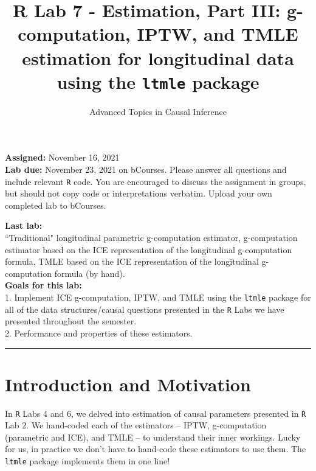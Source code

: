 \documentclass[answers]{exam}
\title{R Lab 7 - Estimation, Part III: g-computation, IPTW, and TMLE estimation for longitudinal data using the \texttt{ltmle} package}
\author{Advanced Topics in Causal Inference}
\date{}
\begin{document}
\maketitle



\maketitle
\noindent \textbf{Assigned:} November 16, 2021\\
\textbf{Lab due:} November 23, 2021 on bCourses. Please answer all questions and include relevant \texttt{R} code. You are encouraged to discuss the assignment in groups, but should not copy code or interpretations verbatim. Upload your own completed lab to bCourses.



\noindent \textbf{Last lab:} \\ 
``Traditional" longitudinal parametric g-computation estimator, g-computation estimator based on the ICE representation of the longitudinal g-computation formula, TMLE based on the ICE representation of the longitudinal g-computation formula (by hand). \\


\noindent \textbf{Goals for this lab:} \\
1. Implement ICE g-computation, IPTW, and TMLE using the \texttt{ltmle} package for all of the data structures/causal questions presented in the \texttt{R} Labs we have presented throughout the semester.\\
2. Performance and properties of these estimators. \\


\begin{center}
\noindent\rule{18cm}{0.4pt}
\end{center}

\section{Introduction and Motivation}


In \texttt{R} Labs 4 and 6, we delved into estimation of causal parameters presented in \texttt{R} Lab 2. We hand-coded each of the estimators -- IPTW, g-computation (parametric and ICE), and TMLE -- to understand their inner workings. Lucky for us, in practice we don't have to hand-code these estimators to use them. The \texttt{ltmle} package implements them in one line! \\
\end{document}
